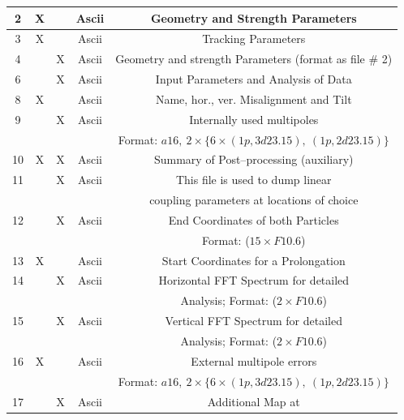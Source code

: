 \documentclass[a4paper,11pt]{report}
\begin{document}
\begin{center}
\begin{longtable}{|c|c|c|c|c|}
  \rule[-3.75mm]{0mm}{10mm}
  2 & X & & Ascii & Geometry and Strength Parameters \\
  \hline \rule[-3.75mm]{0mm}{10mm}
  3 & X & & Ascii & Tracking Parameters \\*
  \hline \rule[-3.75mm]{0mm}{10mm} 4 & & X & Ascii & Geometry and
  strength Parameters (format as file \#
  2) \\
  \hline \rule[-3.75mm]{0mm}{10mm}
  6 & & X & Ascii & Input Parameters and Analysis of Data \\
  \hline \rule[-3.75mm]{0mm}{10mm}
  8 & X & & Ascii & Name, hor., ver. Misalignment and Tilt \\
  \hline \rule[-1.25mm]{0mm}{7.5mm}
  9 & & X & Ascii & Internally used multipoles \\*
  \rule[-3.7mm]{0mm}{7.5mm}
  & & & & Format: $a16,\ 2 \times \{6 \times (1p,3d23.15),\
  (1p,2d23.15)\}$ \\ 
  \hline \rule[-3.75mm]{0mm}{10mm}
  10 & X & X & Ascii & Summary of Post--processing (auxiliary) \\
  \hline \rule[-3.75mm]{0mm}{10mm}
  11 & & X & Ascii & This file is used to dump linear \\*
  \rule[-3.7mm]{0mm}{7.5mm}
  & & & & coupling parameters at locations of choice \\
  \hline \rule[-1.25mm]{0mm}{7.5mm}
  12 & & X & Ascii & End Coordinates of both Particles \\*
  \rule[-3.7mm]{0mm}{7.5mm}
  & & & & Format: ($15 \times F10.6$) \\
  \hline \rule[-3.75mm]{0mm}{10mm}
  13 & X & & Ascii & Start Coordinates for a Prolongation \\
  \hline \rule[-1.25mm]{0mm}{7.5mm}
  14 & & X & Ascii & Horizontal FFT Spectrum for detailed \\*
  \rule[-3.7mm]{0mm}{7.5mm}
  & & & & Analysis; Format:  ($2 \times F10.6$) \\
  \hline \rule[-1.25mm]{0mm}{7.5mm}
  15 & & X & Ascii & Vertical FFT Spectrum for detailed \\*
  \rule[-3.7mm]{0mm}{7.5mm}
  & & & & Analysis; Format: ($2 \times F10.6$) \\
  \hline \rule[-1.25mm]{0mm}{7.5mm}
  16 & X & & Ascii & External multipole errors \\*
  \rule[-3.7mm]{0mm}{7.5mm}
  & & & & Format: $a16,\ 2 \times \{6 \times (1p,3d23.15),\
  (1p,2d23.15)\}$ \\ 
  \hline \rule[-1.25mm]{0mm}{7.5mm}
  17 & & X & Ascii & Additional Map at \\*

\end{longtable}
\end{center}
\end{document}
